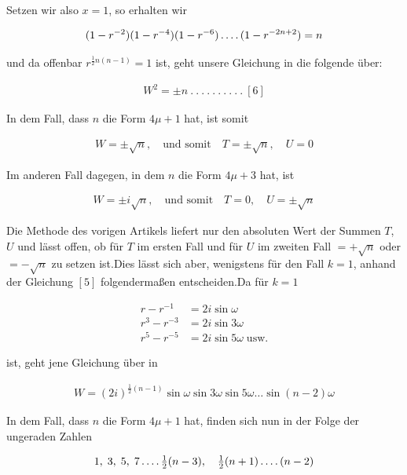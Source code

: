 Setzen wir also $x=1$, so erhalten wir

\[
\begin{aligned}
(1-r^{-2})(1-r^{-4})(1-r^{-6})\mathinner{.\,.\,.\,.}(1-r^{-2n+2})=n
\end{aligned}
\]

und da offenbar $r^{\frac12n(n-1)}=1$ ist, geht unsere Gleichung in die folgende über:

\[
\begin{aligned}
W^2=\pm n\  .\  .\  .\  .\  .\  .\  .\  .\  .\  .\ [6]
\end{aligned}
\]

In dem Fall, dass $n$ die Form $4\mu+1$ hat, ist somit

\[
\begin{aligned}
W=\pm\surd n,\quad\text{und somit}\quad T=\pm\surd n,\quad U=0
\end{aligned}
\]

Im anderen Fall dagegen, in dem $n$ die Form $4\mu+3$ hat, ist

\[
\begin{aligned}
W=\pm i\surd n,\quad\text{und somit}\quad T=0,\quad U=\pm\surd n
\end{aligned}
\]


Die Methode des vorigen Artikels liefert nur den absoluten Wert der Summen $T$, $U$ und lässt offen, ob für $T$ im ersten Fall und für $U$ im zweiten Fall $=+\surd n$ oder $=-\surd n$ zu setzen ist.\quad Dies lässt sich aber, wenigstens für den Fall $k=1$, anhand der Gleichung $[5]$ folgendermaßen entscheiden.\quad Da für $k=1$


\[
\begin{aligned}
r-r^{-1}&=2i\sin\omega\\
r^3-r^{-3}&=2i\sin3\omega\\
r^5-r^{-5}&=2i\sin5\omega\;\text{usw.}
\end{aligned}
\]

ist, geht jene Gleichung über in

\[
\begin{aligned}
W=(2i)^{\frac12(n-1)}\sin\omega\sin3\omega\sin5\omega\ldots\sin(n-2)\omega
\end{aligned}
\]

In dem Fall, dass $n$ die Form $4\mu+1$ hat, finden sich nun in der Folge der ungeraden Zahlen

\[
\begin{aligned}
1,\;3,\;5,\;7\mathinner{.\,.\,.\,.}\tfrac12(n-3),\quad\tfrac12(n+1)\mathinner{.\,.\,.\,.}(n-2)
\end{aligned}
\]

